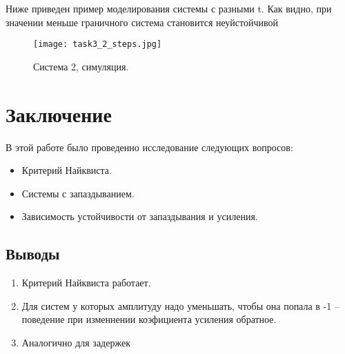 \documentclass[16pt]{article}
\begin{document}
Ниже приведен пример моделирования системы с разными t. Как видно, при значении меньше граничного система становится неуйстойчивой

\begin{figure}[h!]
    \centering
    \texttt{[image: task3\_2\_steps.jpg]}
    \caption{Система 2, симуляция.}
    \label{fig:fig19}
\end{figure}
\newpage
\pagebreak
\section{Заключение}
В этой работе было проведенно исследование следующих вопросов:
\begin{itemize}
    \item Критерий Найквиста.
    \item Системы с запаздыванием.
    \item Зависимость устойчивости от запаздывания и усиления.
\end{itemize} 
\subsection{Выводы}
\begin{enumerate}
    \item Критерий Найквиста работает.
   \item Для систем у которых амплитуду надо уменьшать, чтобы она попала в -1 -- поведение при изменнении коэфициента усиления обратное. 
   \item Аналогично для задержек
\end{enumerate}
\end{document}
